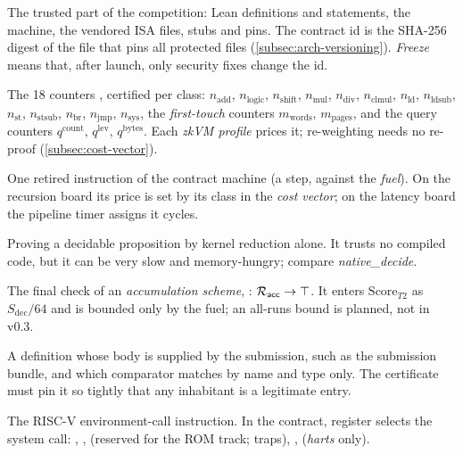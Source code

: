 \begin{description}[leftmargin=0pt,itemsep=2pt,parsep=0pt,font=\normalfont\bfseries]
\item[Contract; contract id.] The trusted part of the competition: Lean definitions and statements,
  the machine, the vendored ISA files, stubs and pins. The contract id is the SHA-256 digest of the
  file that pins all protected files (\cref{subsec:arch-versioning}). \emph{Freeze} means that, after
  launch, only security fixes change the id.

\item[Cost vector.] The 18 counters , certified per class: $n_{\mathrm{add}}$,
  $n_{\mathrm{logic}}$, $n_{\mathrm{shift}}$, $n_{\mathrm{mul}}$, $n_{\mathrm{div}}$,
  $n_{\mathrm{clmul}}$, $n_{\mathrm{ld}}$, $n_{\mathrm{ldsub}}$, $n_{\mathrm{st}}$,
  $n_{\mathrm{stsub}}$, $n_{\mathrm{br}}$, $n_{\mathrm{jmp}}$, $n_{\mathrm{sys}}$, the
  \emph{first-touch} counters $m_{\mathrm{words}}$, $m_{\mathrm{pages}}$, and the query counters
  $q^{\mathrm{count}}$, $q^{\mathrm{lev}}$, $q^{\mathrm{bytes}}$. Each \emph{zkVM profile} prices it;
  re-weighting needs no re-proof (\cref{subsec:cost-vector}).

\item[Cycle.] One retired instruction of the contract machine (a step, against the \emph{fuel}).
  On the recursion board its price is set by its class in the \emph{cost vector}; on the latency
  board the pipeline timer assigns it cycles.

\item[decide +kernel.] Proving a decidable proposition by kernel reduction alone. It trusts no
  compiled code, but it can be very slow and memory-hungry; compare \emph{native\_decide}.

\item[Decider.] The final check of an \emph{accumulation scheme}, : $\mathcal{R}_{\mathsf{acc}}\to\top$. It
  enters $\mathrm{Score}_{T2}$ as $S_{\mathrm{dec}}/64$ and is bounded only by the fuel; an all-runs
  bound is planned, not in v0.3.

\item[Definition hole.] A definition whose body is supplied by the submission, such as the
  submission bundle, and which comparator matches by name and type only. The certificate must pin it
  so tightly that any inhabitant is a legitimate entry.

\item[ECALL.] The RISC-V environment-call instruction. In the contract, register  selects
  the system call: , ,  (reserved for the ROM track; traps),
  ,  (\emph{harts} only).


\end{description}
